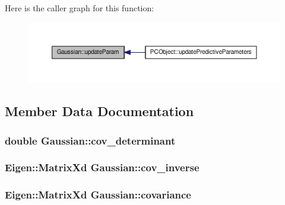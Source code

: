 \-Here is the caller graph for this function\-:
\nopagebreak
\begin{figure}[H]
\begin{center}
\leavevmode
\includegraphics[width=350pt]{class_gaussian_a6d157086ac90e226afd46887fa43c5a8_icgraph}
\end{center}
\end{figure}




\subsection{\-Member \-Data \-Documentation}
\hypertarget{class_gaussian_a5c2ddadca218776ecc2d47ee7dfb2244}{
\subsubsection[{cov\-\_\-determinant}]{\setlength{\rightskip}{0pt plus 5cm}double {\bf \-Gaussian\-::cov\-\_\-determinant}}}\label{class_gaussian_a5c2ddadca218776ecc2d47ee7dfb2244}
\hypertarget{class_gaussian_af2381be5187cf33c49d1c4575382b588}{
\subsubsection[{cov\-\_\-inverse}]{\setlength{\rightskip}{0pt plus 5cm}\-Eigen\-::\-Matrix\-Xd {\bf \-Gaussian\-::cov\-\_\-inverse}}}\label{class_gaussian_af2381be5187cf33c49d1c4575382b588}
\hypertarget{class_gaussian_a62f08da00092ff4db7e0b864a2a68466}{
\subsubsection[{covariance}]{\setlength{\rightskip}{0pt plus 5cm}\-Eigen\-::\-Matrix\-Xd {\bf \-Gaussian\-::covariance}}}\label{class_gaussian_a62f08da00092ff4db7e0b864a2a68466}
